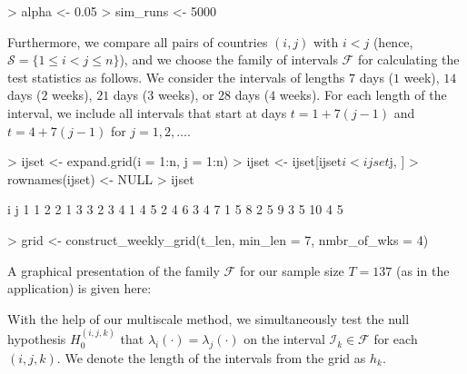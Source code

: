 \documentclass[a4paper]{scrartcl}
\begin{document}
\begin{Schunk}
\begin{Sinput}
> alpha    <- 0.05
> sim_runs <- 5000
\end{Sinput}
\end{Schunk}

Furthermore, we compare all pairs of countries $(i,j)$ with $i < j$ (hence, $\mathcal{S} = \{1 \leq i < j \leq n\}$), and we choose the family of intervals $\mathcal{F}$ for calculating the test statistics as follows. We consider the intervals of lengths $7$ days ($1$ week), $14$ days ($2$ weeks), $21$ days ($3$ weeks), or $28$ days ($4$ weeks). For each length of the interval, we include all intervals that start at days $t = 1 + 7(j-1)$ and $t = 4 + 7(j-1)$ for $j=1,2,\ldots$.

\begin{Schunk}
\begin{Sinput}
> ijset           <- expand.grid(i = 1:n, j = 1:n)
> ijset           <- ijset[ijset$i < ijset$j, ]
> rownames(ijset) <- NULL
> ijset
\end{Sinput}
\begin{Soutput}
   i j
1  1 2
2  1 3
3  2 3
4  1 4
5  2 4
6  3 4
7  1 5
8  2 5
9  3 5
10 4 5
\end{Soutput}
\begin{Sinput}
> grid <- construct_weekly_grid(t_len, min_len = 7, nmbr_of_wks = 4)
\end{Sinput}
\end{Schunk}

A graphical presentation of the family $\mathcal{F}$ for our sample size $T = 137$ (as in the application) is given here:
\begin{Schunk}
\end{Schunk}

With the help of our multiscale method, we simultaneously test the null hypothesis $H_0^{(i, j, k)}$ that $\lambda_i(\cdot) = \lambda_j(\cdot)$ on the interval $_k \in {}$ for each $(i, j, k)$. We denote the length of the intervals from the grid as $h_k$.
\end{document}
